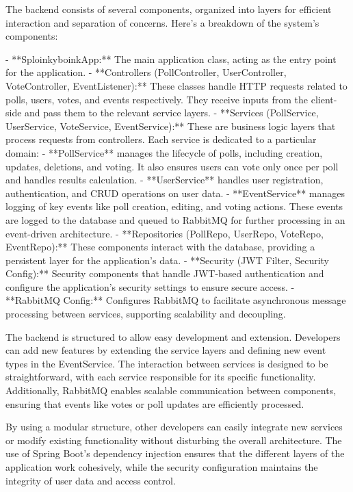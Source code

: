 \vspace{1cm}

The backend consists of several components, organized into layers for efficient interaction and separation of concerns. Here's a breakdown of the system’s components:

- **SploinkyboinkApp:** The main application class, acting as the entry point for the application.
- **Controllers (PollController, UserController, VoteController, EventListener):** These classes handle HTTP requests related to polls, users, votes, and events respectively. They receive inputs from the client-side and pass them to the relevant service layers.
- **Services (PollService, UserService, VoteService, EventService):** These are business logic layers that process requests from controllers. Each service is dedicated to a particular domain:
  - **PollService** manages the lifecycle of polls, including creation, updates, deletions, and voting. It also ensures users can vote only once per poll and handles results calculation.
  - **UserService** handles user registration, authentication, and CRUD operations on user data.
  - **EventService** manages logging of key events like poll creation, editing, and voting actions. These events are logged to the database and queued to RabbitMQ for further processing in an event-driven architecture.
- **Repositories (PollRepo, UserRepo, VoteRepo, EventRepo):** These components interact with the database, providing a persistent layer for the application’s data.
- **Security (JWT Filter, Security Config):** Security components that handle JWT-based authentication and configure the application’s security settings to ensure secure access.
- **RabbitMQ Config:** Configures RabbitMQ to facilitate asynchronous message processing between services, supporting scalability and decoupling.

The backend is structured to allow easy development and extension. Developers can add new features by extending the service layers and defining new event types in the EventService. The interaction between services is designed to be straightforward, with each service responsible for its specific functionality. Additionally, RabbitMQ enables scalable communication between components, ensuring that events like votes or poll updates are efficiently processed.

By using a modular structure, other developers can easily integrate new services or modify existing functionality without disturbing the overall architecture. The use of Spring Boot’s dependency injection ensures that the different layers of the application work cohesively, while the security configuration maintains the integrity of user data and access control.


